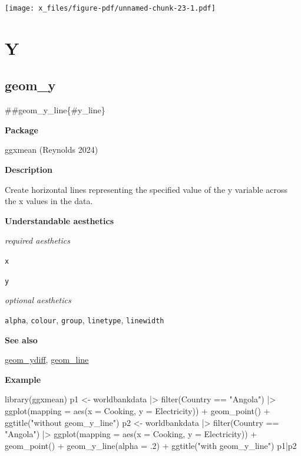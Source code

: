 \documentclass[
  letterpaper,
  DIV=11,
  numbers=noendperiod]{scrreprt}
\newenvironment{Shaded}{\begin{snugshade}}{\end{snugshade}}
\newcommand{\AttributeTok}[1]{\textcolor[rgb]{0.40,0.45,0.13}{#1}}
\newcommand{\DecValTok}[1]{\textcolor[rgb]{0.68,0.00,0.00}{#1}}
\newcommand{\FunctionTok}[1]{\textcolor[rgb]{0.28,0.35,0.67}{#1}}
\newcommand{\NormalTok}[1]{\textcolor[rgb]{0.00,0.23,0.31}{#1}}
\newcommand{\OtherTok}[1]{\textcolor[rgb]{0.00,0.23,0.31}{#1}}
\newcommand{\SpecialCharTok}[1]{\textcolor[rgb]{0.37,0.37,0.37}{#1}}
\newcommand{\StringTok}[1]{\textcolor[rgb]{0.13,0.47,0.30}{#1}}
\begin{document}
\texttt{[image: x\_files/figure-pdf/unnamed-chunk-23-1.pdf]}

\part{Y}

\chapter{geom\_y}\label{sec-y}

\#\#geom\_y\_line\{\#y\_line\}

\textbf{Package}

ggxmean (Reynolds 2024)

\textbf{Description}

Create horizontal lines representing the specified value of the y
variable across the x values in the data.

\textbf{Understandable aesthetics}

\emph{required aesthetics}

\texttt{x}

\texttt{y}

\emph{optional aesthetics}

\texttt{alpha}, \texttt{colour}, \texttt{group}, \texttt{linetype},
\texttt{linewidth}

\textbf{See also}

\hyperref[ydiff]{geom\_ydiff}, \hyperref[line]{geom\_line}

\textbf{Example}

\begin{Shaded}
\begin{Highlighting}[]
\FunctionTok{library}\NormalTok{(ggxmean)}
\NormalTok{p1 }\OtherTok{\textless{}{-}}\NormalTok{ worldbankdata }\SpecialCharTok{|\textgreater{}} 
  \FunctionTok{filter}\NormalTok{(Country }\SpecialCharTok{==} \StringTok{"Angola"}\NormalTok{) }\SpecialCharTok{|\textgreater{}}
  \FunctionTok{ggplot}\NormalTok{(}\AttributeTok{mapping =} \FunctionTok{aes}\NormalTok{(}\AttributeTok{x =}\NormalTok{ Cooking, }\AttributeTok{y =}\NormalTok{ Electricity)) }\SpecialCharTok{+}
\FunctionTok{geom\_point}\NormalTok{()  }\SpecialCharTok{+} \FunctionTok{ggtitle}\NormalTok{(}\StringTok{"without geom\_y\_line"}\NormalTok{)}
\NormalTok{p2 }\OtherTok{\textless{}{-}}\NormalTok{ worldbankdata }\SpecialCharTok{|\textgreater{}} 
  \FunctionTok{filter}\NormalTok{(Country }\SpecialCharTok{==} \StringTok{"Angola"}\NormalTok{) }\SpecialCharTok{|\textgreater{}}
  \FunctionTok{ggplot}\NormalTok{(}\AttributeTok{mapping =} \FunctionTok{aes}\NormalTok{(}\AttributeTok{x =}\NormalTok{ Cooking, }\AttributeTok{y =}\NormalTok{ Electricity)) }\SpecialCharTok{+}
\FunctionTok{geom\_point}\NormalTok{() }\SpecialCharTok{+} \FunctionTok{geom\_y\_line}\NormalTok{(}\AttributeTok{alpha =}\NormalTok{ .}\DecValTok{2}\NormalTok{) }\SpecialCharTok{+} 
  \FunctionTok{ggtitle}\NormalTok{(}\StringTok{"with geom\_y\_line"}\NormalTok{)}
\NormalTok{p1}\SpecialCharTok{|}\NormalTok{p2}
\end{Highlighting}
\end{Shaded}
\end{document}
